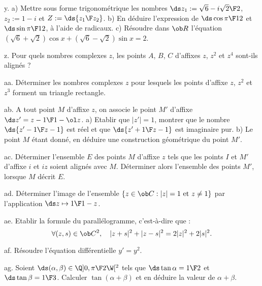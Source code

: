 \exo [Level=1,Fight=1,Learn=1,Field=\NombresComplexes,Type=\TravauxDirigés,Origin=] y. 
a) Mettre sous forme trigonométrique les nombres $\ds z_1:={\sqrt6-i\sqrt2\F2}$, 
$z_2:=1-i$ et $Z:=\ds{z_1\F z_2}$.\pn
b) En déduire l'expression de $\ds\cos{\pi\F12}$ et $\ds\sin{\pi\F12}$, à l'aide de radicaux. \pn
c) Résoudre dans $\ob R$ l'équation $(\sqrt6+\sqrt2)\cos x+(\sqrt6-\sqrt2)\sin x=2$. 

\exo [Level=1,Fight=2,Learn=1,Field=\NombresComplexes,Type=\Exercices,Origin=] z. 
Pour quels nombres complexes $z$, les points $A$, $B$, $C$ d'affixes $z$, $z^2$ et $z^4$ sont-ils alignés ?

\exo [Level=1,Fight=2,Learn=1,Field=\NombresComplexes,Type=\Colles,Origin=] aa. 
Déterminer les nombres complexes $z$ pour lesquels les points d'affixe $z$, $z^2$ et $z^3$ 
forment un triangle rectangle. 

\exo [Level=1,Fight=2,Learn=2,Field=\NombresComplexes,Type=\TravauxDirigés,Origin=] ab. 
A tout point $M$ d'affixe $z$, on associe le point $M'$ d'affixe $\ds z'={z-1\F1-\ol z}$. \pn
a) Etablir que $|z'|=1$, montrer que le nombre $\ds{z'-1\F z-1}$ est réel et que $\ds{z'+1\F z-1}$ est imaginaire pur. \pn
b) Le point $M$ étant donné, en déduire une construction géométrique du point $M'$. 

\exo [Level=1,Fight=2,Learn=1,Field=\NombresComplexes,Type=\Colles,Origin=] ac. 
Déterminer l'ensemble $E$ des points $M$ d'affixe $z$ tels que les points $I$ et $M'$ d'affixe $i$ et $iz$ soient alignés avec $M$. 
Déterminer alors l'ensemble des points $M'$, lorsque $M$ décrit $E$. 

\exo [Level=1,Fight=1,Learn=1,Field=\NombresComplexes,Type=\Exercices,Origin=] ad. 
Déterminer l'image de l'ensemble $\{z\in\ob C:|z|=1\hbox{ et }z\neq1\}$ par l'application $\ds z\mapsto {1\F 1-z}$. 

\exo [Level=1,Fight=0,Learn=0,Field=\NombresComplexes,Type=\Cours,Origin=] ae. 
Etablir la formule du parallélogramme, c'est-à-dire que  : 
$$
\forall (z,s)\in\ob C^2, \quad|z+s|^2+|z-s|^2=2|z|^2+2|s|^2. 
$$
 
\exo [Level=1,Fight=1,Learn=1,Type=\TravauxDirigés,Field=\EquationsDifférentiellesAVariablesSéparables,Origin=\Lakedaemon] af. 
Résoudre l'équation différentielle $y'=y^2$. 

\exo [Level=1,Fight=0,Learn=1,Field=\Trigonométrie,Type=\TravauxDirigés,Origin=] ag. 
Soient $\ds(\alpha,\beta)\in\Q]0,{\pi\F2}\W[^2$ tels que $\ds\tan\alpha={1\F2}$ et $\ds\tan\beta={1\F3}$. \pn
Calculer $\tan(\alpha+\beta)$ et en déduire la valeur de $\alpha+\beta$. 

